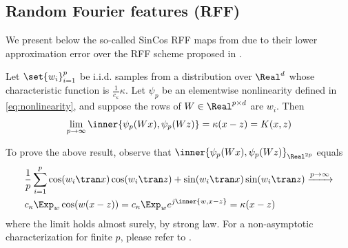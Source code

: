 \documentclass{article}
\def\cite{\citep}
\theoremstyle{plain}
\begin{document}
\subsection{Random Fourier features (RFF)}
We present below the so-called SinCos RFF maps from \cite{sutherland2015error} due to their lower approximation error over the RFF scheme proposed in \cite{rahimi2007random}.
\begin{proposition}\label{prop:rff_proof}
    Let $\set{w_i}_{i=1}^p$ be i.i.d. samples from a distribution over $\Real^d$ whose characteristic function is $\frac1{c_\kappa}\kappa$. Let $\psi_p$ be an elementwise nonlinearity defined in \cref{eq:nonlinearity}, and suppose the rows of $W\in\Real^{p\times d}$ are $w_i$. Then
    \begin{align}
        \lim_{p\to\infty}
        \inner{\psi_p(Wx),\psi_p(Wz)}=\kappa(x-z)=K(x,z)
    \end{align}
\end{proposition}
To prove the above result, observe that $\inner{\psi_p(Wx),\psi_p(Wz)}_{\Real^{2p}}$ equals
\begin{align*}
&\frac{1}p\sum_{i=1}^p\cos(w_i\tran x)\cos(w_i\tran z)+\sin(w_i\tran x)\sin(w_i\tran z)\xrightarrow{p\to\infty}\\
&c_\kappa\Exp_w \cos(w(x-z))= c_\kappa \Exp_w e^{j\inner{w,x-z}}=\kappa(x-z)
\end{align*}
where the limit holds almost surely, by strong law. For a non-asymptotic characterization for finite $p$, please refer to \cite[Prop. 1]{sutherland2015error}.
\end{document}

